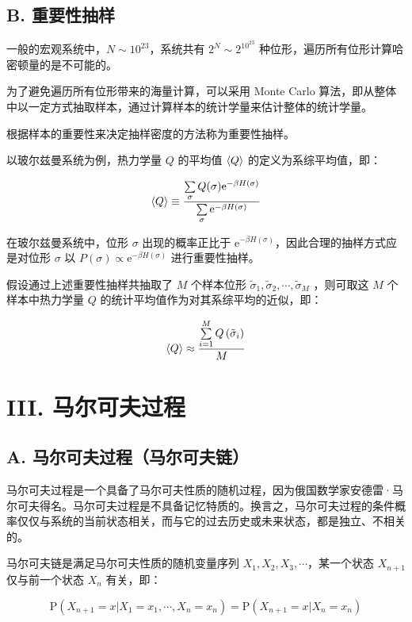 \documentclass[aps,prl,twocolumn,groupedaddress]{revtex4-2}
\begin{document}
\subsection{B. 重要性抽样}

一般的宏观系统中，$N\sim 10^{23} $，系统共有 $2^N\sim 2^{10^{23}} $ 种位形，遍历所有位形计算哈密顿量的是不可能的。

为了避免遍历所有位形带来的海量计算，可以采用 Monte Carlo 算法，即从整体中以一定方式抽取样本，通过计算样本的统计学量来估计整体的统计学量。

根据样本的重要性来决定抽样密度的方法称为重要性抽样。

以玻尔兹曼系统为例，热力学量 $Q $ 的平均值 $\braket{Q} $ 的定义为系综平均值，即：

$$
\braket{Q}
\equiv \frac{\sum\limits_{\sigma} Q(\sigma) \mathrm{e}^{-\beta H(\sigma)} }{\sum\limits_{\sigma} \mathrm{e}^{-\beta H(\sigma)}} 
$$

在玻尔兹曼系统中，位形 $\sigma $ 出现的概率正比于 $\mathrm{e}^{-\beta H(\sigma)} $，因此合理的抽样方式应是对位形 $\sigma $ 以 $P(\sigma)\propto \mathrm{e}^{-\beta H(\sigma)} $ 进行重要性抽样。

假设通过上述重要性抽样共抽取了 $M $ 个样本位形 $\tilde{\sigma}_1,\tilde{\sigma}_2,\cdots,\tilde{\sigma}_M $ ，则可取这 $M $ 个样本中热力学量 $Q $ 的统计平均值作为对其系综平均的近似，即：

$$
\braket{Q}
\approx \frac{\sum\limits_{i=1}^{M} Q\left(\tilde{\sigma}_i \right) }{M } 
$$

\section{III. 马尔可夫过程}

\subsection{A. 马尔可夫过程（马尔可夫链）}

马尔可夫过程是一个具备了马尔可夫性质的随机过程，因为俄国数学家安德雷·马尔可夫得名。马尔可夫过程是不具备记忆特质的。换言之，马尔可夫过程的条件概率仅仅与系统的当前状态相关，而与它的过去历史或未来状态，都是独立、不相关的。

马尔可夫链是满足马尔可夫性质的随机变量序列 $X_1, X_2, X_3,\cdots $，某一个状态 $X_{n+1} $ 仅与前一个状态 $X_n $ 有关，即：

$$
\mathrm{P}\left(X_{n+1} = x | X_1=x_1,\cdots,X_n=x_n \right)
=\mathrm{P}\left(X_{n+1}=x | X_n = x_n \right)
$$
\end{document}
